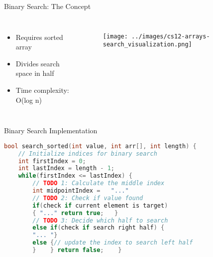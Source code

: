 \documentclass{beamer}
\begin{document}
\begin{frame}{Binary Search: The Concept}
\begin{columns}
\begin{itemize}
\item Requires sorted array
\item Divides search space in half
\item Time complexity: O(log n)
\end{itemize}

\begin{figure}
    \centering
    \texttt{[image: ../images/cs12-arrays-search\_visualization.png]}
\end{figure}
\end{columns}
\end{frame}

\begin{frame}[fragile]{Binary Search Implementation}
\begin{lstlisting}[language=C++]
bool search_sorted(int value, int arr[], int length) {
    // Initialize indices for binary search
    int firstIndex = 0;
    int lastIndex = length - 1;    
    while(firstIndex <= lastIndex) {
        // TODO 1: Calculate the middle index
        int midpointIndex =   "..."      
        // TODO 2: Check if value found
        if(check if current element is target) 
        { "..." return true;   }
        // TODO 3: Decide which half to search
        else if(check if search right half) {
        "... "}
        else {// update the index to search left half
        }    } return false;    }
\end{lstlisting}
\end{frame}
\end{document}
